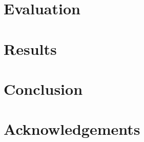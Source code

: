 \documentclass[letterpaper,twocolumn,10pt]{article}
\begin{document}
\section{Evaluation} \label{Evaluation}


\section{Results} \label{Results}


\section{Conclusion} \label{Conclusion}


\section{Acknowledgements} \label{Acknowledgements}





\end{document}
